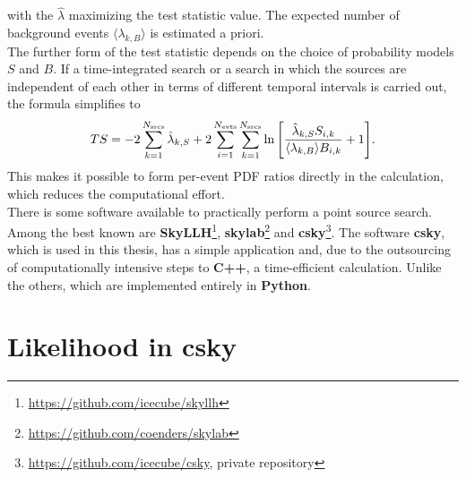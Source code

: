 with the $\hat\lambda$ maximizing the test statistic value.
The expected number of background events $\langle\lambda_{k,B}\rangle$ is estimated a priori.\\
The further form of the test statistic depends on the choice of probability models $S$ and $B$.
If a time-integrated search or a search in which the sources are independent of each other in terms of different temporal intervals is carried out, the formula simplifies to
\begin{equation}
    TS = -2\sum_{k=1}^{N_{\text{srcs}}}\hat\lambda_{k,S} + 2\sum_{i=1}^{N_{\text{evts}}}\sum_{k=1}^{N_{\text{srcs}}}\ln{\left[ \frac{\hat\lambda_{k,S}S_{i,k}}{\langle\lambda_{k,B}\rangle B_{i,k}}+1 \right]}.
\end{equation}
This makes it possible to form per-event PDF ratios directly in the calculation, which reduces the computational effort.\\
There is some software available to practically perform a point source search.
Among the best known are \textbf{SkyLLH}\footnote{\url{https://github.com/icecube/skyllh}}, \textbf{skylab}\footnote{\url{https://github.com/coenders/skylab}} and \textbf{csky}\footnote{\url{https://github.com/icecube/csky}, private repository}.
The software \textbf{csky}, which is used in this thesis, has a simple application and, due to the outsourcing of computationally intensive steps to \textbf{C++}, a time-efficient calculation.
Unlike the others, which are implemented entirely in \textbf{Python}.

\section{Likelihood in csky}

